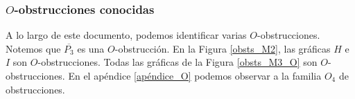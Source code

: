 \subsubsection{$O$-obstrucciones conocidas}

A lo largo de este documento, podemos identificar varias $O$-obstrucciones. Notemos que $\overline{P_3}$ es una $O$-obstrucción. En la Figura \ref{obsts_M2}, las gráficas $H$ e $I$ son $O$-obstrucciones. Todas las gráficas de la Figura \ref{obsts_M3_O} son $O$-obstrucciones. En el apéndice \ref{apéndice_O} podemos observar a la familia $O_4$ de obstrucciones.
